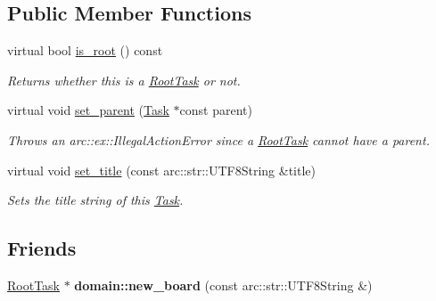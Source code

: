 \subsection*{Public Member Functions}
\begin{DoxyCompactItemize}
\item 
\hypertarget{classsigma_1_1core_1_1tasks_1_1_root_task_a121303d6c4380323fe54bc823ef11514}{virtual bool \hyperlink{classsigma_1_1core_1_1tasks_1_1_root_task_a121303d6c4380323fe54bc823ef11514}{is\-\_\-root} () const }\label{classsigma_1_1core_1_1tasks_1_1_root_task_a121303d6c4380323fe54bc823ef11514}

\begin{DoxyCompactList}\small\item\em Returns whether this is a \hyperlink{classsigma_1_1core_1_1tasks_1_1_root_task}{Root\-Task} or not. \end{DoxyCompactList}\item 
\hypertarget{classsigma_1_1core_1_1tasks_1_1_root_task_a4b9f9c86ba7a0e5b681479a444cd60b1}{virtual void \hyperlink{classsigma_1_1core_1_1tasks_1_1_root_task_a4b9f9c86ba7a0e5b681479a444cd60b1}{set\-\_\-parent} (\hyperlink{classsigma_1_1core_1_1tasks_1_1_task}{Task} $\ast$const parent)}\label{classsigma_1_1core_1_1tasks_1_1_root_task_a4b9f9c86ba7a0e5b681479a444cd60b1}

\begin{DoxyCompactList}\small\item\em Throws an arc\-::ex\-::\-Illegal\-Action\-Error since a \hyperlink{classsigma_1_1core_1_1tasks_1_1_root_task}{Root\-Task} cannot have a parent. \end{DoxyCompactList}\item 
\hypertarget{classsigma_1_1core_1_1tasks_1_1_root_task_a825247badddb1934e51ace7df99503f3}{virtual void \hyperlink{classsigma_1_1core_1_1tasks_1_1_root_task_a825247badddb1934e51ace7df99503f3}{set\-\_\-title} (const arc\-::str\-::\-U\-T\-F8\-String \&title)}\label{classsigma_1_1core_1_1tasks_1_1_root_task_a825247badddb1934e51ace7df99503f3}

\begin{DoxyCompactList}\small\item\em Sets the title string of this \hyperlink{classsigma_1_1core_1_1tasks_1_1_task}{Task}. \end{DoxyCompactList}\end{DoxyCompactItemize}
\subsection*{Friends}
\begin{DoxyCompactItemize}
\item 
\hypertarget{classsigma_1_1core_1_1tasks_1_1_root_task_aa9cd0697dba448e5a3349d45503a9239}{\hyperlink{classsigma_1_1core_1_1tasks_1_1_root_task}{Root\-Task} $\ast$ {\bfseries domain\-::new\-\_\-board} (const arc\-::str\-::\-U\-T\-F8\-String \&)}\label{classsigma_1_1core_1_1tasks_1_1_root_task_aa9cd0697dba448e5a3349d45503a9239}

\end{DoxyCompactItemize}
